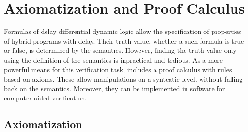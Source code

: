 \chapter{Axiomatization and Proof Calculus}
\label{ch:axiomatization-proof-calculus}

Formulas of delay differential dynamic logic allow the specification of properties of hybrid programs with delay. Their truth value, whether a such formula is true or false, is determined by the semantics. However, finding the truth value only using the definition of the semantics is inpractical and tedious. As a more powerful means for this verification task, \ddL includes a proof calculus with rules based on axioms. These allow manipulations on a syntcatic level, without falling back on the semantics.
Moreover, they can be implemented in software for computer-aided verification.

\section{Axiomatization}
    \label{sec:axiomatization}

    \newsavebox{\Rval}%
    \sbox{\Rval}{$\scriptstyle\R$}

